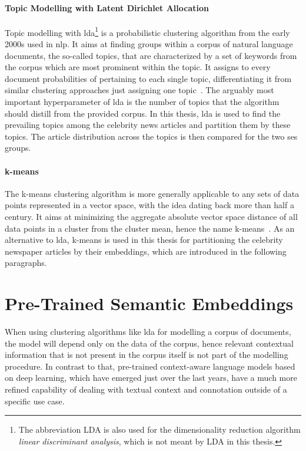 \paragraph{Topic Modelling with Latent Dirichlet Allocation}\label{ch:lda}
Topic modelling with \gls{lda}\footnote{The abbreviation LDA is also used for the dimensionality reduction algorithm \textit{linear discriminant analysis}, which is not meant by LDA in this thesis.} is a probabilistic clustering algorithm from the early 2000s used in \gls{nlp}. It aims at finding groups within a corpus of natural language documents, the so-called topics, that are characterized by a set of keywords from the corpus which are most prominent within the topic. It assigns to every document probabilities of pertaining to each single topic, differentiating it from similar clustering approaches just assigning one topic~\autocite{blei_latent_2003, blei_probabilistic_2012}. The arguably most important hyperparameter of \gls{lda} is the number of topics that the algorithm should distill from the provided corpus. In this thesis, \gls{lda} is used to find the prevailing topics among the celebrity news articles and partition them by these topics. The article distribution across the topics is then compared for the two \gls{ses} groups.

\paragraph{k-means}
The k-means clustering algorithm is more generally applicable to any sets of data points represented in a vector space, with the idea dating back more than half a century. It aims at minimizing the aggregate absolute vector space distance of all data points in a cluster from the cluster mean, hence the name k-means~\autocite{macqueen_methods_1967}. As an alternative to \gls{lda}, k-means is used in this thesis for partitioning the celebrity newspaper articles by their embeddings, which are introduced in the following paragraphs.



\section{Pre-Trained Semantic Embeddings}\label{ch:pretrained_algorithms}
When using clustering algorithms like \gls{lda} for modelling a corpus of documents, the model will depend only on the data of the corpus, hence relevant contextual information that is not present in the corpus itself is not part of the modelling procedure. 
In contrast to that, pre-trained context-aware language models based on deep learning, which have emerged just over the last years, have a much more refined capability of dealing with textual context and connotation outside of a specific use case.

